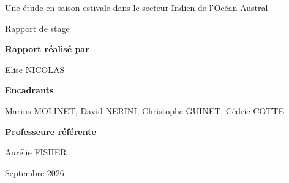 \documentclass[11pt,a4paper,oneside]{report}
\begin{document}
\begin{titlepage}
		{\large
			Une étude en saison estivale dans le secteur Indien de l'Océan Austral
			\par}
		
		\vspace{0.25cm}
		
		{\large
			Rapport de stage
			\par}
		
		\vfill
		
		{\large\bfseries Rapport réalisé par\par}
		\vspace{0.15cm}
		{\large Elise NICOLAS\par}
		
		\vspace{0.55cm}
		
		{\large\bfseries Encadrants\par}
		\vspace{0.15cm}
		{\large
			Marius MOLINET, David NERINI, Christophe GUINET, Cédric COTTE
			\par}
		
		\vspace{0.55cm}
		
		{\large\bfseries Professeure référente\par}
		\vspace{0.15cm}
		{\large Aurélie FISHER\par}
		
		\vspace{0.55cm}
		
		{\large Septembre 2026\par}
		
		\vspace*{0.4cm}
		
	\end{titlepage}
	
	\clearpage
	
	
	\clearpage
	\tableofcontents
	
	\clearpage
	
	\clearpage
	
	\clearpage
	
	\clearpage
	
	\clearpage
	
	\clearpage
	\listoffigures
	\listoftables
	
	\printbibliography
\end{document}
